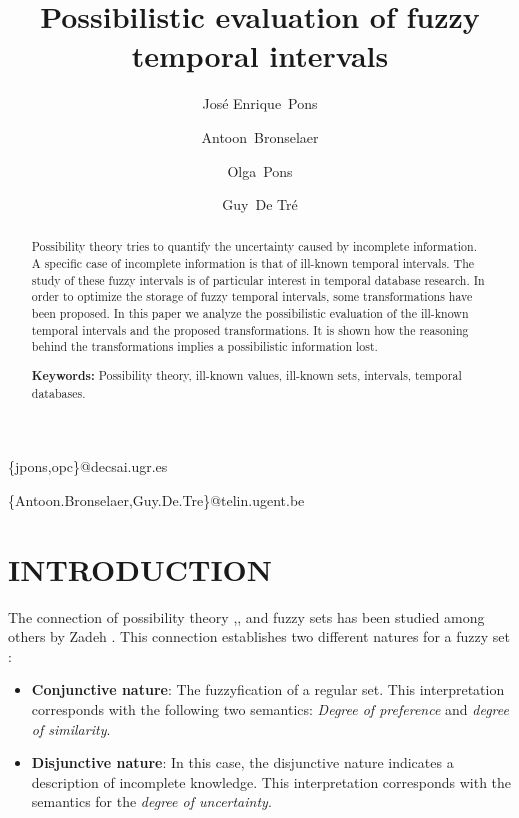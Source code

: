 \documentclass[twoside,twocolumn,a4paper]{article}
\begin{document}
\title{Possibilistic evaluation of fuzzy temporal intervals}


\author[1]{Jos\'e Enrique~Pons}
\author[2]{Antoon~Bronselaer}
\author[1]{Olga~Pons}
\author[2]{Guy~De Tr\'e}
\address[1]{Department of Computer Science and Artificial Intelligence,University of Granada, Spain}{\{jpons,opc\}@decsai.ugr.es}
\address[2]{Department of Telecommunications and Information Processing, Ghent University, Belgium}{\{Antoon.Bronselaer,Guy.De.Tre\}@telin.ugent.be}

\maketitle

\begin{abstract}
Possibility theory tries to quantify the uncertainty caused by incomplete information. A specific case of incomplete information is that of ill-known temporal intervals. The study of these fuzzy intervals is of particular interest in temporal database research. In order to optimize the storage of fuzzy temporal intervals, some transformations have been proposed. In this paper we analyze the possibilistic evaluation of the ill-known temporal intervals and the proposed transformations. It is shown how the reasoning behind the transformations implies a possibilistic information lost. 

\textbf{Keywords:} Possibility theory, ill-known values, ill-known sets, intervals, temporal databases.\vspace{9mm}
\end{abstract}

\section{INTRODUCTION}

The connection of possibility theory \cite{Zadeh78},\cite{Shackle61},\cite{Gaines75} and fuzzy sets has been studied among others by Zadeh \cite{Zadeh65}. This connection establishes two different natures for a fuzzy set \cite{Dubois97}:
\begin{itemize}
\item
\textbf{Conjunctive nature}: The fuzzyfication of a regular set. This interpretation corresponds with the following two semantics: \textit{Degree of preference} and \textit{degree of similarity}.
\item
\textbf{Disjunctive nature}: In this case, the disjunctive nature indicates a description of incomplete knowledge. This interpretation corresponds with the semantics for the \textit{degree of uncertainty}.
\end{itemize}
\end{document}
